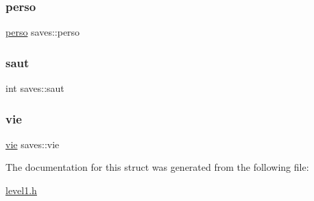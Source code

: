 \mbox{\label{structsaves_a4ba3cba27704215b96311513ee206401}} 
\subsubsection{\texorpdfstring{perso}{perso}}
{\footnotesize\ttfamily \hyperlink{structperso}{perso} saves\+::perso}

\mbox{\label{structsaves_a57efa80fe293ed60438a596d1f42c3b0}} 
\subsubsection{\texorpdfstring{saut}{saut}}
{\footnotesize\ttfamily int saves\+::saut}

\mbox{\label{structsaves_ad07a79adf13feb4ffe0f035724ddb04b}} 
\subsubsection{\texorpdfstring{vie}{vie}}
{\footnotesize\ttfamily \hyperlink{structvie}{vie} saves\+::vie}



The documentation for this struct was generated from the following file\+:\begin{DoxyCompactItemize}
\item 
\hyperlink{level1_8h}{level1.\+h}\end{DoxyCompactItemize}
